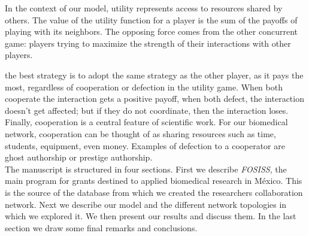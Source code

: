 \documentclass{bmcart}
\begin{document}
In the context of our model, utility represents
  access to resources shared by others.
  The value of the utility function for a player is the sum of the payoffs of playing
  with its neighbors. The opposing force comes from the other concurrent game: players
  trying to maximize the strength of their interactions with other players. 
  

  the best strategy is to adopt the same strategy as the other player, as it pays the most,
  regardless of cooperation or defection in the utility game. When
  both cooperate the interaction gets a positive payoff, when both defect, the
  interaction doesn't get affected; but if they do not coordinate, then the
  interaction loses. Finally, cooperation is a central feature of scientific work.
  For our biomedical network, cooperation can be thought of
  as sharing resources such as time, students, equipment, even money. Examples of defection
  to a cooperator are ghost authorship or
  prestige authorship.\\



The manuscript is structured in four sections. First we describe
\textit{FOSISS}, the main program for grants destined to applied biomedical 
research in M\'exico. This is the source of the
database from which we created the researchers collaboration network. Next we
describe our model
and the different network topologies in which we explored it.
We then present our results and discuss them. In the last section
we draw some final remarks and conclusions.
\end{document}
